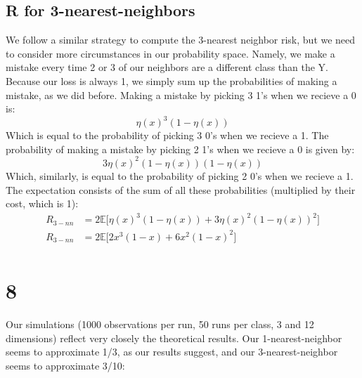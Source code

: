 \documentclass[a4paper,12pt]{article}
\begin{document}
\subsection*{R for 3-nearest-neighbors}
We follow a similar strategy to compute the 3-nearest neighbor risk, but we need to consider more circumstances in our probability space. Namely, we make a mistake every time 2 or 3 of our neighbors are a different class than the Y. Because our loss is always 1, we simply sum up the probabilities of making a mistake, as we did before. Making a mistake by picking 3 1's when we recieve a 0 is:
%
$$
\eta(x)^3(1 - \eta(x))
$$
%
Which is equal to the probability of picking 3 0's when we recieve a 1. The probability of making a mistake by picking 2 1's when we recieve a 0 is given by:
%
$$
3\eta(x)^2(1-\eta(x))(1-\eta(x))
$$
%
Which, similarly, is equal to the probability of picking 2 0's when we recieve a 1. The expectation consists of the sum of all these probabilities (multiplied by their cost, which is 1):
\begin{align*}
R_{3-nn} &= 2\mathbb{E} \big[ \eta(x)^3(1 - \eta(x)) + 3\eta(x)^2(1-\eta(x))^2 \big] \\
R_{3-nn} &= 2\mathbb{E} \big[ 2x^3(1 - x) + 6x^2(1 - x)^2 \big] \\
\end{align*}
\section*{8}
Our simulations (1000 observations per run, 50 runs per class, 3 and 12 dimensions) reflect very closely the theoretical results. Our 1-nearest-neighbor seems to approximate 1/3, as our results suggest, and our 3-nearest-neighbor seems to approximate 3/10:
\end{document}
